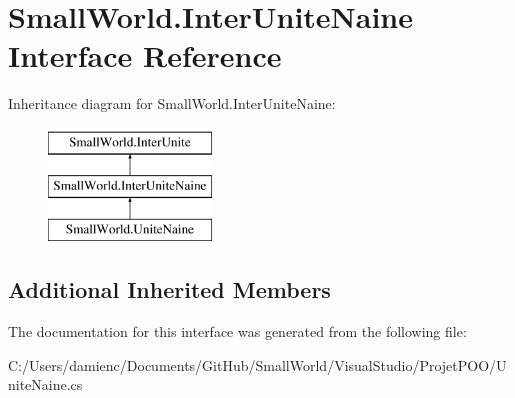\hypertarget{interface_small_world_1_1_inter_unite_naine}{\section{Small\-World.\-Inter\-Unite\-Naine Interface Reference}
\label{interface_small_world_1_1_inter_unite_naine}
}
Inheritance diagram for Small\-World.\-Inter\-Unite\-Naine\-:\begin{figure}[H]
\begin{center}
\leavevmode
\includegraphics[height=3.000000cm]{interface_small_world_1_1_inter_unite_naine}
\end{center}
\end{figure}
\subsection*{Additional Inherited Members}


The documentation for this interface was generated from the following file\-:\begin{DoxyCompactItemize}
\item 
C\-:/\-Users/damienc/\-Documents/\-Git\-Hub/\-Small\-World/\-Visual\-Studio/\-Projet\-P\-O\-O/Unite\-Naine.\-cs\end{DoxyCompactItemize}
